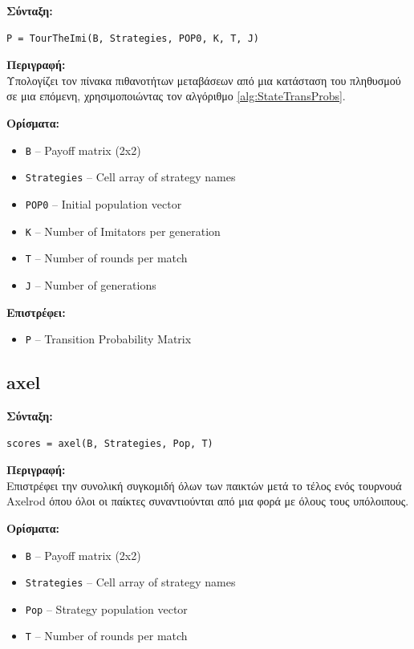 \documentclass[12pt]{report}
\begin{document}
\textbf{\foreignlanguage{greek}{Σύνταξη}:}
\begin{verbatim}
P = TourTheImi(B, Strategies, POP0, K, T, J)
\end{verbatim}

\textbf{\foreignlanguage{greek}{Περιγραφή:}} \\
\foreignlanguage{greek}{
Υπολογίζει τον πίνακα πιθανοτήτων μεταβάσεων από μια κατάσταση του πληθυσμού σε μια επόμενη, χρησιμοποιώντας τον αλγόριθμο \ref{alg:StateTransProbs}.}

\textbf{\foreignlanguage{greek}{Ορίσματα:}}
\begin{itemize}
    \item \texttt{B} – Payoff matrix (2x2)
    \item \texttt{Strategies} – Cell array of strategy names
    \item \texttt{POP0} – Initial population vector
    \item \texttt{K} – Number of Imitators per generation
    \item \texttt{T} – Number of rounds per match
    \item \texttt{J} – Number of generations
\end{itemize}

\textbf{\foreignlanguage{greek}{Επιστρέφει}:}
\begin{itemize}
    \item \texttt{P} – Transition Probability Matrix
\end{itemize}

\subsection*{axel}

\textbf{\foreignlanguage{greek}{Σύνταξη}:}
\begin{verbatim}
scores = axel(B, Strategies, Pop, T)
\end{verbatim}

\textbf{\foreignlanguage{greek}{Περιγραφή:}} \\
\foreignlanguage{greek}{
Επιστρέφει την συνολική συγκομιδή όλων των παικτών μετά το τέλος ενός τουρνουά \foreignlanguage{english}{Axelrod} όπου όλοι οι παίκτες συναντιούνται από μια φορά με όλους τους υπόλοιπους.}

\textbf{\foreignlanguage{greek}{Ορίσματα:}}
\begin{itemize}
    \item \texttt{B} – Payoff matrix (2x2)
    \item \texttt{Strategies} – Cell array of strategy names
    \item \texttt{Pop} – Strategy population vector
    \item \texttt{T} – Number of rounds per match
\end{itemize}
\end{document}
